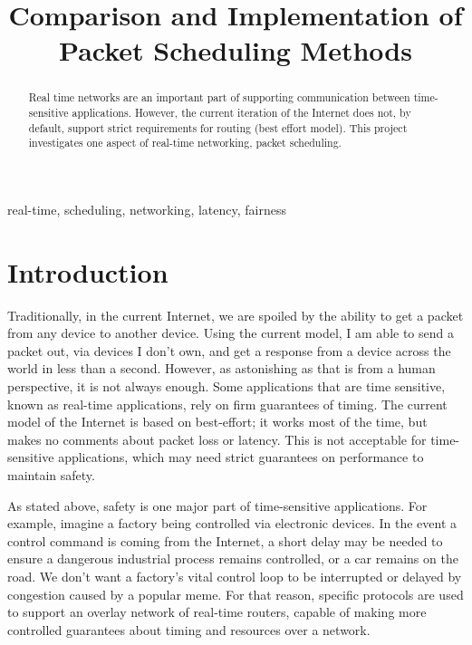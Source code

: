 \documentclass[conference]{IEEEtran}
\begin{document}
\title{Comparison and Implementation of Packet Scheduling Methods}

    \author{
    }

    \maketitle

    \begin{abstract}
        Real time networks are an important part of supporting communication between time-sensitive applications.
        However, the current iteration of the Internet does not, by default, support strict requirements for routing (best
        effort model).
        This project investigates one aspect of real-time networking, packet scheduling.
    \end{abstract}

    \begin{IEEEkeywords}
        real-time, scheduling, networking, latency, fairness
    \end{IEEEkeywords}

    \section{Introduction}
    Traditionally, in the current Internet, we are spoiled by the ability to get a packet from any device to another device.
    Using the current model, I am able to send a packet out, via devices I don't own, and get a response from a device across the
    world in less than a second.
    However, as astonishing as that is from a human perspective, it is not always enough.
    Some applications that are time sensitive, known as real-time applications, rely on firm guarantees of timing.
    The current model of the Internet is based on best-effort; it works most of the time, but makes no comments about packet
    loss or latency.
    This is not acceptable for time-sensitive applications, which may need strict guarantees on performance
    to maintain safety.

    As stated above, safety is one major part of time-sensitive applications.
    For example, imagine a factory being controlled
    via electronic devices.
    In the event a control command is coming from the Internet, a short delay may be needed to ensure
    a dangerous industrial process remains controlled, or a car remains on the road.
    We don't want a factory's vital control
    loop to be interrupted or delayed by congestion caused by a popular meme.
    For that reason, specific protocols are used
    to support an overlay network of real-time routers, capable of making more controlled guarantees about timing and resources
    over a network.
\end{document}
